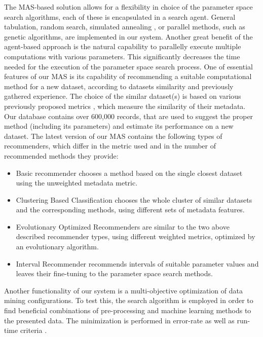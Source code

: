 The MAS-based solution allows for a flexibility in choice of the parameter space search algorithms, each of these is encapsulated in a search agent. General tabulation, random search, simulated annealing \cite{aima3ed}, or parallel methods, such as genetic algorithms, are implemented in our system. Another great benefit of the agent-based approach is the natural capability to parallelly execute multiple computations with various parameters. This significantly decreases the time needed for the execution of the parameter space search process. One of essential features of our MAS is its capability of recommending a suitable computational method for a new dataset, according to datasets similarity and previously gathered experience. The choice of the similar dataset(s) is based on various previously proposed metrics \cite{hierarchicalClustering}, which measure the similarity of their metadata. Our database contains over 600,000 records, that are used to suggest the proper method (including its parameters) and estimate its performance on a new dataset. The latest version of our MAS contains the following types of recommenders, which differ in the metric used and in the number of recommended methods they provide:
\begin{itemize}
	\item Basic recommender chooses a method based on the single closest dataset using the unweighted metadata metric.
	\item Clustering Based Classification \cite{jaICMLA2013} chooses the whole cluster of similar datasets and the corresponding methods, using different sets of metadata features.
	\item Evolutionary Optimized Recommenders are similar to the two above described recommender types, using different weighted metrics, optimized by an evolutionary algorithm.
	\item Interval Recommender recommends intervals of suitable parameter values and leaves their fine-tuning to the parameter space search methods.
\end{itemize}
Another functionality of our system is a multi-objective optimization of data mining configurations. To test this, the search algorithm is employed in order to find beneficial combinations of pre-processing and machine learning methods to the presented data. The minimization is performed in error-rate as well as run-time criteria \cite{Kazik2015}.

